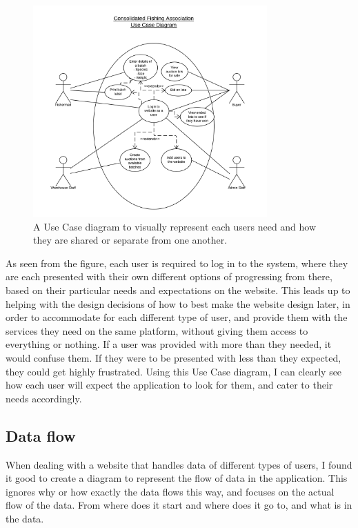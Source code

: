 \documentclass{article}
\begin{document}
\begin{figure}[H]
	\centering
	\includegraphics[width=0.8\textwidth]{img/TA-UCD1.png}
	\caption{A Use Case diagram to visually represent each users need and how they are shared or separate from one another.}
\end{figure}

As seen from the figure, each user is required to log in to the system, where they are each presented with their own different options of progressing from there, based on their particular needs and expectations on the website. This leads up to helping with the design decisions of how to best make the website design later, in order to accommodate for each different type of user, and provide them with the services they need on the same platform, without giving them access to everything or nothing.
If a user was provided with more than they needed, it would confuse them. If they were to be presented with less than they expected, they could get highly frustrated. Using this Use Case diagram, I can clearly see how each user will expect the application to look for them, and cater to their needs accordingly.

\subsection{Data flow}
When dealing with a website that handles data of different types of users, I found it good to create a diagram to represent the flow of data in the application. This ignores why or how exactly the data flows this way, and focuses on the actual flow of the data. From where does it start and where does it go to, and what is in the data. 
\end{document}
